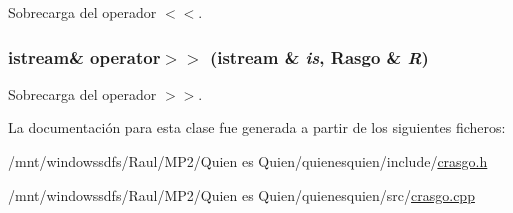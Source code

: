 Sobrecarga del operador $<$$<$. 

\hypertarget{class_rasgo_9b71675e73bfbb2fd72fd8fcfe3ea656}{
\subsubsection[{operator$>$$>$}]{\setlength{\rightskip}{0pt plus 5cm}istream\& operator$>$$>$ (istream \& {\em is}, \/  {\bf Rasgo} \& {\em R})}}
\label{class_rasgo_9b71675e73bfbb2fd72fd8fcfe3ea656}


Sobrecarga del operador $>$$>$. 



La documentación para esta clase fue generada a partir de los siguientes ficheros:\begin{CompactItemize}
\item 
/mnt/windowssdfs/Raul/MP2/Quien es Quien/quienesquien/include/\hyperlink{crasgo_8h}{crasgo.h}\item 
/mnt/windowssdfs/Raul/MP2/Quien es Quien/quienesquien/src/\hyperlink{crasgo_8cpp}{crasgo.cpp}\end{CompactItemize}
